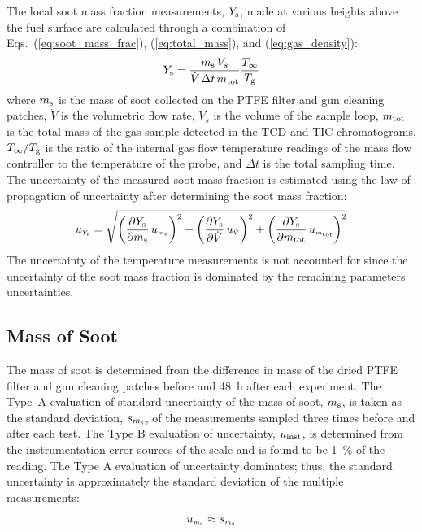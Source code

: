 \documentclass[12pt]{article}
\begin{document}
The local soot mass fraction measurements, $Y_{\rm s}$, made at various heights above the fuel surface are calculated through a combination of Eqs.~(\ref{eq:soot_mass_frac}), (\ref{eq:total_mass}), and (\ref{eq:gas_density}):
\begin{equation}\label{eq:overall_soot_mass_frac}
Y_{\rm s}= \frac{m_{\rm s} \, V_{s}}{\dot{V} \, \Delta t \, m_{\rm tot}}\frac{T_{\rm \infty}}{T_{\rm g}}
\end{equation}
where $m_{\rm s}$ is the mass of soot collected on the PTFE filter and gun cleaning patches, $\dot{V}$ is the volumetric flow rate, $V_{s}$ is the volume of the sample loop, $m_{\rm tot}$ is the total mass of the gas sample detected in the TCD and TIC chromatograms, $T_{\rm \infty}/T_{\rm g}$ is the ratio of the internal gas flow temperature readings of the mass flow controller to the temperature of the probe, and $\Delta t$ is the total sampling time. The uncertainty of the measured soot mass fraction is estimated using the law of propagation of uncertainty after determining the soot mass fraction:
\begin{equation}
\label{eq:soot_mass_frac_uncertainty}
u_{\scriptscriptstyle Y_{\rm s}} = \sqrt{{\left(\frac{\partial Y_{\rm s}}{\partial m_{\rm s}}\,u_{\scriptscriptstyle m_{\rm s}} \right)}^2+{\left(\frac{\partial Y_{\rm s}}{\partial \dot{V} }\,u_{\scriptscriptstyle \dot{V}} \right)}^2+{\left(\frac{\partial Y_{\rm s}}{\partial m_{\rm tot}}\,u_{\scriptscriptstyle m_{\rm tot}} \right)}^2}
\end{equation}
The uncertainty of the temperature measurements is not accounted for since the uncertainty of the soot mass fraction is dominated by the remaining parameters uncertainties.

\subsection{Mass of Soot}
\label{ssec:Mass_of_Soot}

The mass of soot is determined from the difference in mass of the dried PTFE filter and gun cleaning patches before and 48~h after each experiment. The Type~A evaluation of standard uncertainty of the mass of soot, $m_{\rm s}$, is taken as the standard deviation, $s_{m_{\rm s}}$, of the measurements sampled three times before and after each test. The Type B evaluation of uncertainty, $u_{\rm inst}$, is determined from the instrumentation error sources of the scale and is found to be 1~\% of the reading. The Type A evaluation of uncertainty dominates; thus, the standard uncertainty is approximately the standard deviation of the multiple measurements:
\begin{equation}
\label{eq:soot_mass_uncertainty}
u_{\scriptscriptstyle m_{\rm s}}\approx s_{\scriptscriptstyle m_{\rm s}}
\end{equation}
\end{document}
